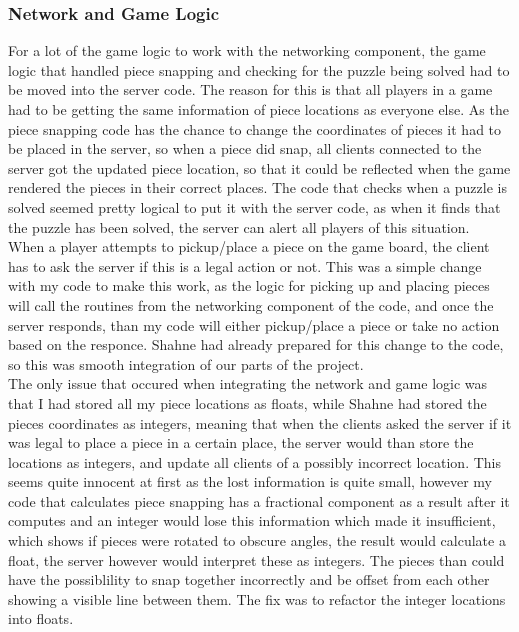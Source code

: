 \documentclass{article}
\begin{document}
\subsubsection{Network and Game Logic}
For a lot of the game logic to work with the networking component, the game
logic that handled piece snapping and checking for the puzzle being solved had
to be moved into the server code. The reason for this is that all players in a
game had to be getting the same information of piece locations as everyone
else. As the piece snapping code has the chance to change the coordinates of
pieces it had to be placed in the server, so when a piece did snap, all clients
connected to the server got the updated piece location, so that it could be
reflected when the game rendered the pieces in their correct places. The code
that checks when a puzzle is solved seemed pretty logical to put it with the
server code, as when it finds that the puzzle has been solved, the server can
alert all players of this situation.\\

When a player attempts to pickup/place a piece on the game board, the client
has to ask the server if this is a legal action or not. This was a simple change
with my code to make this work, as the logic for picking up and placing pieces
will call the routines from the networking component of the code, and once the
server responds, than my code will either pickup/place a piece or take no action
based on the responce. Shahne had already prepared for this change to the code,
so this was smooth integration of our parts of the project.\\

The only issue that occured when integrating the network and game logic was that
I had stored all my piece locations as floats, while Shahne had stored the
pieces coordinates as integers, meaning that when the clients asked the server
if it was legal to place a piece in a certain place, the server would than store
the locations as integers, and update all clients of a possibly incorrect
location. This seems quite innocent at first as the lost information is quite
small, however my code that calculates piece snapping has a fractional component
as a result after it computes and an integer would lose this information which
made it insufficient, which shows if pieces were rotated to obscure angles, the
result would calculate a float, the server however would interpret these as
integers. The pieces than could have the possiblility to snap together
incorrectly and be offset from each other showing a visible line between
them. The fix was to refactor the integer locations into floats.
\end{document}
